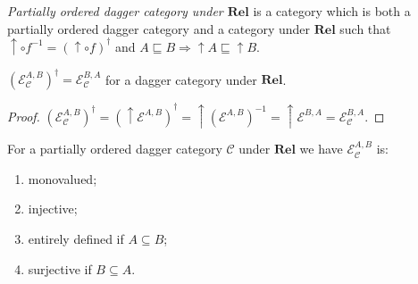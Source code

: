 \begin{defn}
  \emph{Partially ordered dagger category under $\mathbf{Rel}$} is
  a category which is both a partially ordered dagger category and a category
  under $\mathbf{Rel}$ such that $\uparrow \circ f^{- 1} = (\uparrow
  \circ f)^{\dagger}$ and $A \sqsubseteq B \Rightarrow \uparrow A \sqsubseteq
  \uparrow B$.
\end{defn}

\begin{prop}
  $(\mathcal{E}_{\mathcal{C}}^{A,B})^{\dagger} = \mathcal{E}_{\mathcal{C}}^{B,A}$ for a dagger category under
  $\mathbf{Rel}$.
\end{prop}

\begin{proof}
  $(\mathcal{E}_{\mathcal{C}}^{A,B})^{\dagger} = (\uparrow \mathcal{E}^{A,B})^{\dagger} = \uparrow (\mathcal{E}^{A,B})^{- 1} =
  \uparrow \mathcal{E}^{B,A} = \mathcal{E}_{\mathcal{C}}^{B,A}$.
\end{proof}

\begin{prop}
  For a partially ordered dagger category $\mathcal{C}$ under
  $\mathbf{Rel}$ we have $\mathcal{E}_{\mathcal{C}}^{A,B}$ is:
  \begin{enumerate}
    \item monovalued;
    
    \item injective;
    
    \item entirely defined if $A \subseteq B$;
    
    \item surjective if $B \subseteq A$.
  \end{enumerate}
\end{prop}

